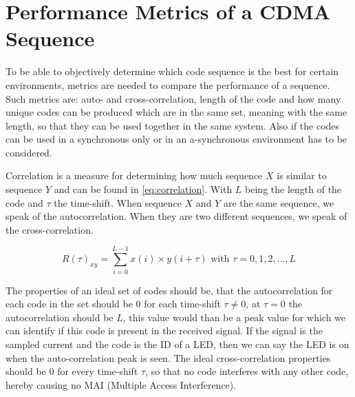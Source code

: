 
\section{Performance Metrics of a CDMA Sequence}
\label{sec:performance-metrics-cdma}

To be able to objectively determine which code sequence is the best for certain environments, metrics are needed to compare the performance of a sequence.
Such metrics are: auto- and cross-correlation, length of the code and how many unique codes can be produced which are in the same set, meaning with the same length, so that they can be used together in the same system.
Also if the codes can be used in a synchronous only or in an a-synchronous environment has to be considered.


Correlation is a measure for determining how much sequence $X$ is similar to sequence $Y$ and can be found in \autoref{eq:correlation}.
With $L$ being the length of the code and $\tau$ the time-shift.
When sequence $X$ and $Y$ are the same sequence, we speak of the autocorrelation.
When they are two different sequences, we speak of the cross-correlation. 

\begin{equation}
	R(\tau)_{xy} = \displaystyle\sum_{i = 0} ^ {L - 1} x(i) \times y(i + \tau) {\text{  with $\tau = 0, 1, 2, \dotsc, L$}}
	\label{eq:correlation}
\end{equation}








The properties of an ideal set of codes should be, that the autocorrelation for each code in the set should be $0$ for each time-shift $\tau \neq 0$, at $\tau = 0$ the autocorrelation should be $L$, this value would than be a peak value for which we can identify if this code is present in the received signal.
If the signal is the sampled current and the code is the ID of a LED, then we can say the LED is on when the auto-correlation peak is seen.
The ideal cross-correlation properties should be $0$ for every time-shift $\tau$, so that no code interferes with any other code, hereby causing no MAI (Multiple Access Interference).



